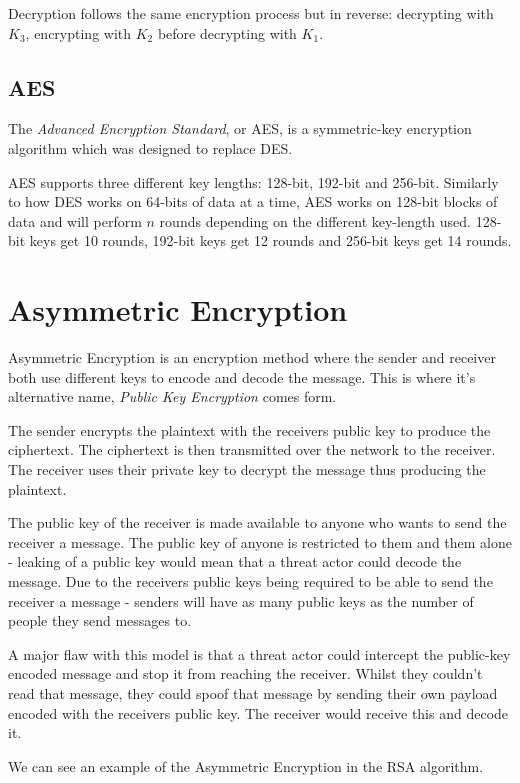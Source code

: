 Decryption follows the same encryption process but in reverse: decrypting with $K_3$, encrypting with $K_2$ before decrypting with $K_1$. 

\subsection{AES}
The \textit{Advanced Encryption Standard}, or AES, is a symmetric-key encryption algorithm which was designed to replace DES.

AES supports three different key lengths: 128-bit, 192-bit and 256-bit. Similarly to how DES works on 64-bits of data at a time, AES works on 128-bit blocks of data and will perform $n$ rounds depending on the different key-length used. 128-bit keys get 10 rounds, 192-bit keys get 12 rounds and 256-bit keys get 14 rounds. 

\section{Asymmetric Encryption}
Asymmetric Encryption is an encryption method where the sender and receiver both use different keys to encode and decode the message. This is where it's alternative name, \textit{Public Key Encryption} comes form.

The sender encrypts the plaintext with the receivers public key to produce the ciphertext. The ciphertext is then transmitted over the network to the receiver. The receiver uses their private key to decrypt the message thus producing the plaintext. 

The public key of the receiver is made available to anyone who wants to send the receiver a message. The public key of anyone is restricted to them and them alone - leaking of a public key would mean that a threat actor could decode the message. Due to the receivers public keys being required to be able to send the receiver a message - senders will have as many public keys as the number of people they send messages to.

A major flaw with this model is that a threat actor could intercept the public-key encoded message and stop it from reaching the receiver. Whilst they couldn't read that message, they could spoof that message by sending their own payload encoded with the receivers public key. The receiver would receive this and decode it. 

We can see an example of the Asymmetric Encryption in the RSA algorithm. 